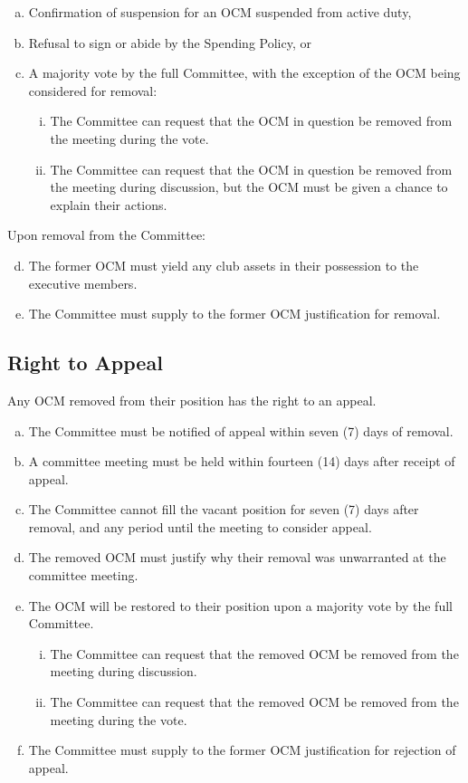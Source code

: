 \documentclass[a4paper,12pt]{article}
\begin{document}
\begin{enumerate}[a)]
	\item Confirmation of suspension for an OCM suspended from active duty,
	\item Refusal to sign or abide by the Spending Policy, or
	\item A majority vote by the full Committee, with the exception of the OCM being considered for removal:
	\begin{enumerate}[i)]
		\item The Committee can request that the OCM in question be removed from the meeting during the vote.
		\item The Committee can request that the OCM in question be removed from the meeting during discussion, but the OCM must be given a chance to explain their actions.
	\end{enumerate}
\end{enumerate}

Upon removal from the Committee:

\begin{enumerate}[a)]
	\setcounter{enumi}{3}
	\item The former OCM must yield any club assets in their possession to the executive members.
	\item The Committee must supply to the former OCM justification for removal.
\end{enumerate}

\subsection{Right to Appeal}

Any OCM removed from their position has the right to an appeal.

\begin{enumerate}[a)]
	\item The Committee must be notified of appeal within seven (7) days of removal.
	\item A committee meeting must be held within fourteen (14) days after receipt of appeal.
	\item The Committee cannot fill the vacant position for seven (7) days after removal, and any period until the meeting to consider appeal.
	\item The removed OCM must justify why their removal was unwarranted at the committee meeting.
	\item The OCM will be restored to their position upon a majority vote by the full Committee.
	\begin{enumerate}[i)]
		\item The Committee can request that the removed OCM be removed from the meeting during discussion.
		\item The Committee can request that the removed OCM be removed from the meeting during the vote.
	\end{enumerate}
	\item The Committee must supply to the former OCM justification for rejection of appeal.
\end{enumerate}
\end{document}
